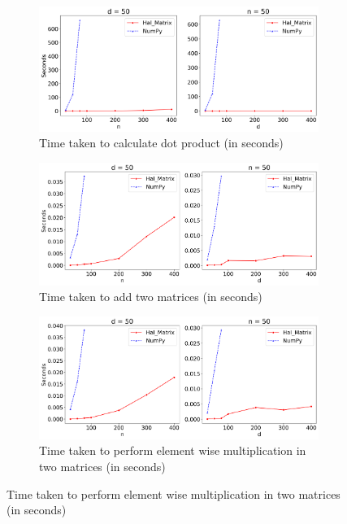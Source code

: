 \documentclass[11pt,twocolumn]{article}
\begin{document}
    \begin{figure}[h!]
    \centering
    \begin{subfigure}{\linewidth}
        \includegraphics[width=\linewidth]{graphs/dot2.png}
        \caption{Time taken to calculate dot product (in seconds)}
        \label{img:dot}
    \end{subfigure}
    \begin{subfigure}{\linewidth}
        \includegraphics[width=\linewidth]{graphs/add2.png}
        \caption{Time taken to add two matrices (in seconds)}
        \label{img:add}
    \end{subfigure}
    \begin{subfigure}{\linewidth}
        \includegraphics[width=\linewidth]{graphs/mul2.png}
        \caption{Time taken to perform element wise multiplication in two matrices (in seconds)}

\end{subfigure}
\end{figure}
\end{document}
